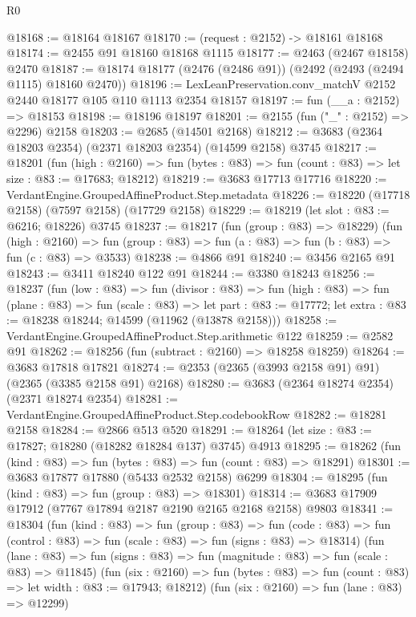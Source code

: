 \begin{lexlean}{R0}
\begin{coremodule}
@18168 := @18164 @18167
@18170 := (request : @2152) -> @18161 @18168
@18174 := @2455 @91 @18160 @18168 @1115
@18177 := @2463 (@2467 @18158) @2470
@18187 := @18174 @18177 (@2476 (@2486 @91)) (@2492 (@2493 (@2494 @1115) @18160 @2470))
@18196 := LexLeanPreservation.conv_matchV @2152 @2440 @18177 @105 @110 @1113 @2354 @18157
@18197 := fun (__a : @2152) => @18153
@18198 := @18196 @18197
@18201 := @2155 (fun ("_" : @2152) => @2296) @2158
@18203 := @2685 (@14501 @2168)
@18212 := @3683 (@2364 @18203 @2354) (@2371 @18203 @2354) (@14599 @2158) @3745
@18217 := @18201
    (fun (high : @2160) =>
    fun (bytes : @83) => fun (count : @83) => let size : @83 := @17683; @18212)
@18219 := @3683 @17713 @17716
@18220 := VerdantEngine.GroupedAffineProduct.Step.metadata
@18226 := @18220 (@17718 @2158) (@7597 @2158) (@17729 @2158)
@18229 := @18219 (let slot : @83 := @6216; @18226) @3745
@18237 := @18217
    (fun (group : @83) => @18229)
    (fun (high : @2160) =>
    fun (group : @83) => fun (a : @83) => fun (b : @83) => fun (c : @83) => @3533)
@18238 := @4866 @91
@18240 := @3456 @2165 @91
@18243 := @3411 @18240 @122 @91
@18244 := @3380 @18243
@18256 := @18237
    (fun (low : @83) =>
    fun (divisor : @83) =>
    fun (high : @83) =>
    fun (plane : @83) =>
    fun (scale : @83) =>
    let part : @83 := @17772; let extra : @83 := @18238 @18244; @14599 (@11962 (@13878 @2158)))
@18258 := VerdantEngine.GroupedAffineProduct.Step.arithmetic @122
@18259 := @2582 @91
@18262 := @18256 (fun (subtract : @2160) => @18258 @18259)
@18264 := @3683 @17818 @17821
@18274 := @2353 (@2365 (@3993 @2158 @91) @91) (@2365 (@3385 @2158 @91) @2168)
@18280 := @3683 (@2364 @18274 @2354) (@2371 @18274 @2354)
@18281 := VerdantEngine.GroupedAffineProduct.Step.codebookRow
@18282 := @18281 @2158
@18284 := @2866 @513 @520
@18291 := @18264 (let size : @83 := @17827; @18280 (@18282 @18284 @137) @3745) @4913
@18295 := @18262 (fun (kind : @83) => fun (bytes : @83) => fun (count : @83) => @18291)
@18301 := @3683 @17877 @17880 (@5433 @2532 @2158) @6299
@18304 := @18295 (fun (kind : @83) => fun (group : @83) => @18301)
@18314 := @3683 @17909 @17912 (@7767 @17894 @2187 @2190 @2165 @2168 @2158) @9803
@18341 := @18304
    (fun (kind : @83) =>
    fun (group : @83) =>
    fun (code : @83) => fun (control : @83) => fun (scale : @83) => fun (signs : @83) => @18314)
    (fun (lane : @83) => fun (signs : @83) => fun (magnitude : @83) => fun (scale : @83) => @11845)
    (fun (six : @2160) =>
    fun (bytes : @83) => fun (count : @83) => let width : @83 := @17943; @18212)
    (fun (six : @2160) => fun (lane : @83) => @12299)

\end{coremodule}
\end{lexlean}
